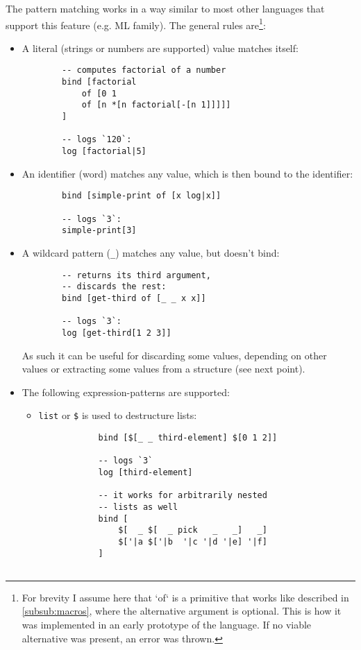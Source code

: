 The pattern matching works in a way similar to most other languages that support this feature (e.g. ML family). The general rules are\footnote{For brevity I assume here that `of` is a primitive that works like described in \ref{subsub:macros}, where the alternative argument is optional. This is how it was implemented in an early prototype of the language. If no viable alternative was present, an error was thrown.}:
\begin{itemize}
    \item A literal (strings or numbers are supported) value matches itself:
    \begin{lstlisting}
        -- computes factorial of a number
        bind [factorial
            of [0 1 
            of [n *[n factorial[-[n 1]]]]]
        ]
        
        -- logs `120`:
        log [factorial|5]
    \end{lstlisting}
    \item An identifier (word) matches any value, which is then bound to the identifier:
    \begin{lstlisting}
        bind [simple-print of [x log|x]]
        
        -- logs `3`:
        simple-print[3]
    \end{lstlisting}
    \item A wildcard pattern (\texttt{\_}) matches any value, but doesn't bind:
    \begin{lstlisting}
        -- returns its third argument,
        -- discards the rest:
        bind [get-third of [_ _ x x]]
        
        -- logs `3`:
        log [get-third[1 2 3]]
    \end{lstlisting}
    As such it can be useful for discarding some values, depending on other values or extracting some values from a structure (see next point).
    \item The following expression-patterns are supported:
    \begin{itemize}
        \item \texttt{list} or \texttt{\$} is used to destructure lists:
        \begin{lstlisting}
            bind [$[_ _ third-element] $[0 1 2]]
            
            -- logs `3`
            log [third-element]
            
            -- it works for arbitrarily nested
            -- lists as well
            bind [
                $[  _ $[  _ pick   _   _]   _]
                $['|a $['|b  '|c '|d '|e] '|f]
            ]
            

\end{lstlisting}
\end{itemize}
\end{itemize}
